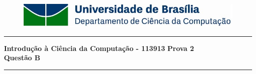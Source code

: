 \documentclass[a4paper, 12pt]{article}
\begin{document}
\begin{figure}[H]
	\includegraphics[scale=0.9]{UnB_CiC_Logo.jpg}
\end{figure}
\noindent\rule{\textwidth}{0.4pt}
\begin{center}
	\textbf{{\Large Introdução à Ciência da Computação - 113913}} \newline \newline
	\textbf{{\large Prova 2} \\
	\vspace{9pt}
	{\large Questão B}} \\
	\noindent\rule{\textwidth}{0.4pt}
	\newline
\end{center}
\end{document}
